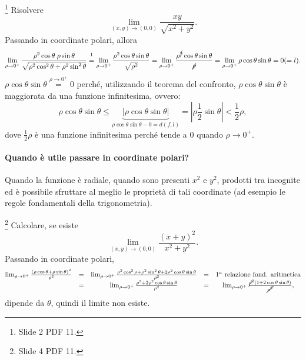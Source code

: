 \begin{example}\footnote{Slide 2 PDF 11.}
    Risolvere
    \begin{equation*}
        \lim_{(x,y)\rightarrow(0,0)}\frac{xy}{\sqrt{x^2+y^2}}.
    \end{equation*}
    Passando in coordinate polari, allora
    \begin{equation*}
        \lim_{\rho\rightarrow 0^+}\frac{\rho^2\cos\theta\;\rho\sin\theta}{\sqrt{\rho^2\cos^2\theta+\rho^2\sin^2\theta}}\overset{\footnotemark}{=}\lim_{\rho\rightarrow 0^+}\frac{\rho^2\cos\theta\sin\theta}{\sqrt{\rho^2}}=\lim_{\rho\rightarrow 0^+}\frac{\rho^{\cancel{2}}\cos\theta\sin\theta}{\cancel{\rho}}=\lim_{\rho\rightarrow 0^+}\rho\cos\theta\sin\theta=0(=l).
    \end{equation*}
    $\rho\cos\theta\sin\theta\overset{\rho\rightarrow0^+}{=}0$ perché, utilizzando il teorema del confronto, $\rho\cos\theta\sin\theta$ è maggiorata da una \gls{funzione infinitesima}, ovvero:
    \begin{equation*}
        \rho\cos\theta\sin\theta\leq\underbrace{|\rho\cos\theta\sin\theta|}_{\rho\cos\theta\sin\theta-0=d(f,l)}=\left|\rho\frac{1}{2}\sin\theta\right|<\frac{1}{2}\rho,
    \end{equation*}
    dove $\frac{1}{2}\rho$ è una funzione infinitesima perché tende a 0 quando $\rho\rightarrow 0^+$.
\end{example}

\paragraph{Quando è utile passare in coordinate polari?} Quando la funzione è radiale, quando sono presenti $x^2$ e $y^2$, prodotti tra incognite ed è possibile sfruttare al meglio le proprietà di tali coordinate (ad esempio le regole fondamentali della trigonometria).

\begin{example}\footnote{Slide 4 PDF 11.}
    Calcolare, se esiste
    \begin{equation*}
        \lim_{(x,y)\rightarrow(0,0)}\frac{(x+y)^2}{x^2+y^2}.
    \end{equation*}
    Passando in coordinate polari,
    \begin{equation*}
        \begin{matrix}
            \lim_{\rho\rightarrow 0^+}\frac{(\rho\cos\theta+\rho\sin\theta)^2}{\rho^2}&=&\lim_{\rho\rightarrow 0^+}\frac{\rho^2\cos^2\rho+\rho^2\sin^2\theta+2\rho^2\cos\theta\sin\theta}{\rho^2}&=& 1^a\text{ relazione fond. aritmetica}\\
            &=&\lim_{\rho\rightarrow0^+}\frac{\rho^2+2\rho^2\cos\theta\sin\theta}{\rho^2}&=&\lim_{\rho\rightarrow0^+}\frac{\cancel{\rho}^2(1+2\cos\theta\sin\theta)}{\cancel{\rho^2}},
        \end{matrix}
    \end{equation*}
    dipende da $\theta$, quindi il limite non esiste.
\end{example}

